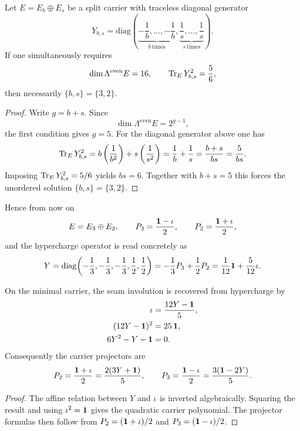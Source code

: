 \begin{theorem}
Let $E=E_b\oplus E_s$ be a split carrier with traceless diagonal generator
\[
Y_{b,s}
=
\mathrm{diag}\!\left(
\underbrace{-\frac1b,\ldots,-\frac1b}_{b\ \text{times}},
\underbrace{\frac1s,\ldots,\frac1s}_{s\ \text{times}}
\right).
\]
If one simultaneously requires
\begin{equation}
\label{eq:minimal-carrier-conditions}
\dim \Lambda^{\mathrm{even}}E=16,
\qquad
\operatorname{Tr}_E Y_{b,s}^2=\frac56,
\end{equation}
then necessarily $\{b,s\}=\{3,2\}$.
\end{theorem}

\begin{proof}
Write $g=b+s$. Since
\[
\dim \Lambda^{\mathrm{even}}E=2^{g-1},
\]
the first condition gives $g=5$. For the diagonal generator above one has
\[
\operatorname{Tr}_E Y_{b,s}^2
=
b\left(\frac{1}{b^2}\right)+s\left(\frac{1}{s^2}\right)
=
\frac1b+\frac1s
=
\frac{b+s}{bs}
=
\frac{5}{bs}.
\]
Imposing $\operatorname{Tr}_E Y_{b,s}^2=5/6$ yields $bs=6$. Together with $b+s=5$ this forces the unordered solution $\{b,s\}=\{3,2\}$.
\end{proof}

Hence from now on
\[
E=E_3\oplus E_2,
\qquad
P_3=\frac{\mathbf 1-\iota}{2},
\qquad
P_2=\frac{\mathbf 1+\iota}{2},
\]
and the hypercharge operator is read concretely as
\begin{equation}
\label{eq:explicit-hypercharge}
Y
=
\mathrm{diag}\!\left(-\frac13,-\frac13,-\frac13,\frac12,\frac12\right)
=
-\frac13 P_3+\frac12 P_2
=
\frac1{12}\mathbf 1+\frac5{12}\iota.
\end{equation}

\begin{lemma}
On the minimal carrier, the seam involution is recovered from hypercharge by
\begin{align}
\iota&=\frac{12Y-\mathbf 1}{5},
\label{eq:hypercharge-seam-inversion}\\
(12Y-\mathbf 1)^2&=25\,\mathbf 1,
\nonumber\\
6Y^2-Y-\mathbf 1&=0.
\label{eq:carrier-polynomial}
\end{align}
Consequently the carrier projectors are
\[
P_2=\frac{\mathbf 1+\iota}{2}=\frac{2(3Y+\mathbf 1)}{5},
\qquad
P_3=\frac{\mathbf 1-\iota}{2}=\frac{3(\mathbf 1-2Y)}{5}.
\]
\end{lemma}

\begin{proof}
The affine relation between $Y$ and $\iota$ is inverted algebraically. Squaring the result and using $\iota^2=\mathbf 1$ gives the quadratic carrier polynomial. The projector formulas then follow from $P_2=(\mathbf 1+\iota)/2$ and $P_3=(\mathbf 1-\iota)/2$.
\end{proof}

